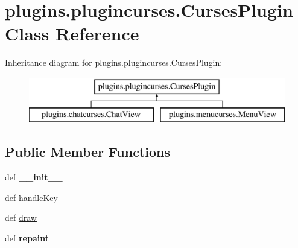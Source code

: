 \hypertarget{classplugins_1_1plugincurses_1_1_curses_plugin}{\section{plugins.\-plugincurses.\-Curses\-Plugin \-Class \-Reference}
\label{classplugins_1_1plugincurses_1_1_curses_plugin}
}
\-Inheritance diagram for plugins.\-plugincurses.\-Curses\-Plugin\-:\begin{figure}[H]
\begin{center}
\leavevmode
\includegraphics[height=2.000000cm]{classplugins_1_1plugincurses_1_1_curses_plugin}
\end{center}
\end{figure}
\subsection*{\-Public \-Member \-Functions}
\begin{DoxyCompactItemize}
\item 
\hypertarget{classplugins_1_1plugincurses_1_1_curses_plugin_a13b389c8fb7ec6c1fd1719cc73fdf5c7}{def {\bfseries \-\_\-\-\_\-init\-\_\-\-\_\-}}\label{classplugins_1_1plugincurses_1_1_curses_plugin_a13b389c8fb7ec6c1fd1719cc73fdf5c7}

\item 
def \hyperlink{classplugins_1_1plugincurses_1_1_curses_plugin_acea30dc25e5a20e911e257845b8ac430}{handle\-Key}
\item 
def \hyperlink{classplugins_1_1plugincurses_1_1_curses_plugin_a54904428b032d020b8c2ad81f03b74f0}{draw}
\item 
\hypertarget{classplugins_1_1plugincurses_1_1_curses_plugin_a8dcc0fef85a3f25ed661dcdae06e3c40}{def {\bfseries repaint}}\label{classplugins_1_1plugincurses_1_1_curses_plugin_a8dcc0fef85a3f25ed661dcdae06e3c40}

\end{DoxyCompactItemize}
